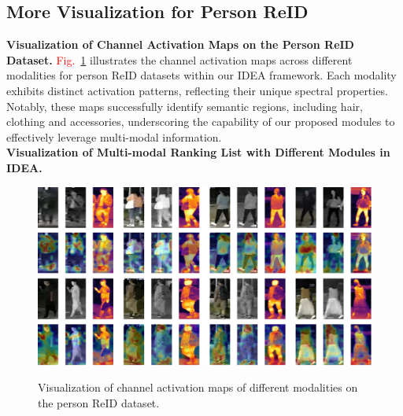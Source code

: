 \subsection{More Visualization for Person ReID}
\textbf{Visualization of Channel Activation Maps on the Person ReID Dataset.}
\textcolor{red}{Fig.}~\ref{fig:channel_act} illustrates the channel activation maps across different modalities for person ReID datasets within our IDEA framework.
%
Each modality exhibits distinct activation patterns, reflecting their unique spectral properties.
%
Notably, these maps successfully identify semantic regions, including hair, clothing and accessories, underscoring the capability of our proposed modules to effectively leverage multi-modal information.
\\
\textbf{Visualization of Multi-modal Ranking List with Different Modules in IDEA.}
\begin{figure}[t]
  \centering
    \resizebox{0.475\textwidth}{!}
    {
  \includegraphics[width=30.\linewidth]{sec/supp_img/SUPP_ACT_MAP.pdf}
  }
  \vspace{-6mm}
   \caption{Visualization of channel activation maps of different modalities on the person ReID dataset.}
  \label{fig:channel_act}
  \vspace{-4mm}
\end{figure}
